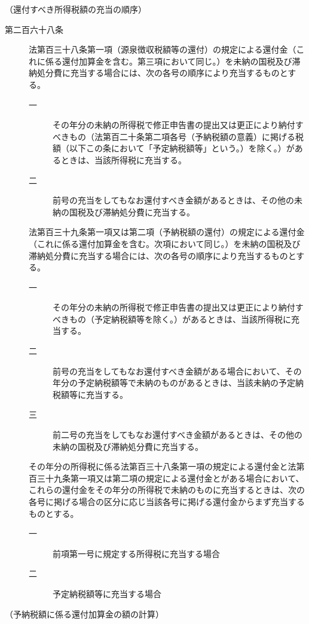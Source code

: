 \documentclass[twocolumn,a4j,10pt]{ltjtarticle}
\begin{document}
\noindent\hspace{10pt}（還付すべき所得税額の充当の順序）
\begin{description}
\item[第二百六十八条]法第百三十八条第一項（源泉徴収税額等の還付）の規定による還付金（これに係る還付加算金を含む。第三項において同じ。）を未納の国税及び滞納処分費に充当する場合には、次の各号の順序により充当するものとする。
\begin{description}
\item[一]その年分の未納の所得税で修正申告書の提出又は更正により納付すべきもの（法第百二十条第二項各号（予納税額の意義）に掲げる税額（以下この条において「予定納税額等」という。）を除く。）があるときは、当該所得税に充当する。
\item[二]前号の充当をしてもなお還付すべき金額があるときは、その他の未納の国税及び滞納処分費に充当する。
\end{description}
\item[]法第百三十九条第一項又は第二項（予納税額の還付）の規定による還付金（これに係る還付加算金を含む。次項において同じ。）を未納の国税及び滞納処分費に充当する場合には、次の各号の順序により充当するものとする。
\begin{description}
\item[一]その年分の未納の所得税で修正申告書の提出又は更正により納付すべきもの（予定納税額等を除く。）があるときは、当該所得税に充当する。
\item[二]前号の充当をしてもなお還付すべき金額がある場合において、その年分の予定納税額等で未納のものがあるときは、当該未納の予定納税額等に充当する。
\item[三]前二号の充当をしてもなお還付すべき金額があるときは、その他の未納の国税及び滞納処分費に充当する。
\end{description}
\item[]その年分の所得税に係る法第百三十八条第一項の規定による還付金と法第百三十九条第一項又は第二項の規定による還付金とがある場合において、これらの還付金をその年分の所得税で未納のものに充当するときは、次の各号に掲げる場合の区分に応じ当該各号に掲げる還付金からまず充当するものとする。
\begin{description}
\item[一]前項第一号に規定する所得税に充当する場合
\item[二]予定納税額等に充当する場合
\end{description}
\end{description}
\noindent\hspace{10pt}（予納税額に係る還付加算金の額の計算）
\end{document}
